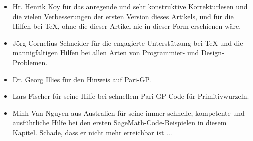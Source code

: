 \begin{refsegment}
\begin{itemize}
  \item {Hr. Henrik Koy für das anregende und sehr konstruktive
         Korrekturlesen und die vielen Verbesserungen der ersten
	 Version dieses Artikels, und für die Hilfen bei TeX, ohne die
	 dieser Artikel nie in dieser Form erschienen wäre.}

  \item {Jörg Cornelius Schneider für die engagierte Unterstützung bei TeX und
         die mannigfaltigen Hilfen bei allen Arten von Programmier- und
	 Design-Problemen.}

  \item {Dr. Georg Illies für den Hinweis auf Pari-GP.}

  \item {Lars Fischer für seine Hilfe bei schnellem Pari-GP-Code
         für Primitivwurzeln.}

  \item {Minh Van Nguyen aus Australien für seine immer schnelle, kompetente und
         ausführliche Hilfe bei den ersten SageMath-Code-Beispielen
	 in diesem Kapitel. Schade, dass er nicht mehr erreichbar ist ...}

\end{itemize}

\end{refsegment}

